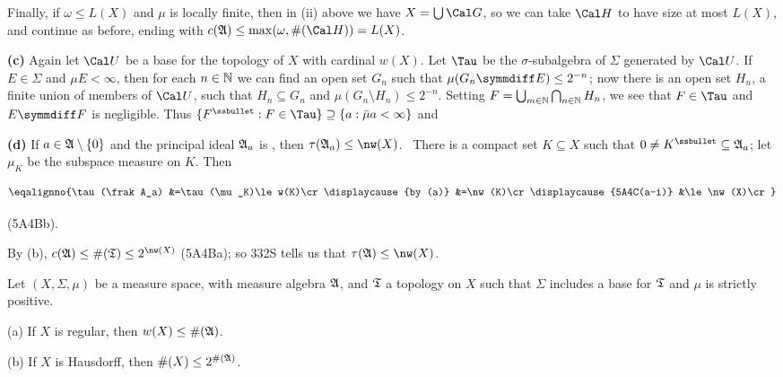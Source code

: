 {\medskip

 Finally, if $\omega\le L(X)$ and $\mu$ is locally
finite, then in (ii) above we have $X=\bigcup\Cal G$, so we can take
$\Cal H$ to have size at most $L(X)$, and continue as before, ending
with $c(\frak A)\le\max(\omega,\#(\Cal H))=L(X)$.

\medskip

{\bf (c)} Again let $\Cal U$ be a base for the topology of $X$ with
cardinal $w(X)$.   Let $\Tau$ be the $\sigma$-subalgebra of $\Sigma$
generated by $\Cal U$.   If $E\in\Sigma$ and $\mu E<\infty$, then for
each $n\in\Bbb N$ we can find an open set $G_n$ such that
$\mu(G_n\symmdiff E)\le 2^{-n}$;  now there is an
open set $H_n$, a finite union of members of $\Cal U$, such that
$H_n\subseteq G_n$ and $\mu(G_n\setminus H_n)\le 2^{-n}$.   Setting
$F=\bigcup_{m\in\Bbb N}\bigcap_{n\in\Bbb N}H_n$, we see that $F\in\Tau$
and $E\symmdiff F$ is negligible.   Thus
$\{F^{\ssbullet}:F\in\Tau\}\supseteq\{a:\bar\mu a<\infty\}$ and


\medskip

{\bf (d)} If $a\in\frak A\setminus\{0\}$ and the principal ideal
$\frak A_a$ is \Mth, then $\tau(\frak A_a)\le\nw(X)$.   \Prf\ There is a
compact set $K\subseteq X$ such that
$0\ne K^{\ssbullet}\subseteq\frak A_a$;  let $\mu_K$ be the subspace
measure on $K$.   Then

$$\eqalignno{\tau(\frak A_a)
&=\tau(\mu_K)\le w(K)\cr
\displaycause{by (a)}
&=\nw(K)\cr
\displaycause{5A4C(a-i)}
&\le\nw(X)\cr}$$

\noindent (5A4Bb).\ \Qed

By (b), $c(\frak A)\le\#(\frak T)\le 2^{\nw(X)}$ (5A4Ba);  so 332S tells
us that $\tau(\frak A)\le\nw(X)$.
}%

 Let $(X,\Sigma,\mu)$ be a measure space,
with measure algebra $\frak A$, and $\frak T$ a topology on $X$ such
that $\Sigma$ includes a base for $\frak T$ and $\mu$ is strictly
positive.

(a) If $X$ is regular, then $w(X)\le\#(\frak A)$.

(b) If $X$ is Hausdorff, then $\#(X)\le 2^{\#(\frak A)}$.


